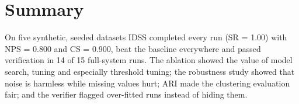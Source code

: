 \FloatBarrier
\section{Summary}\label{sec:7.11}

On five synthetic, seeded datasets IDSS completed every run (SR = 1.00) with NPS = 0.800 and CS = 0.900, beat the baseline everywhere and passed verification in 14 of 15 full-system runs. The ablation showed the value of model search, tuning and especially threshold tuning; the robustness study showed that noise is harmless while missing values hurt; ARI made the clustering evaluation fair; and the verifier flagged over-fitted runs instead of hiding them.
